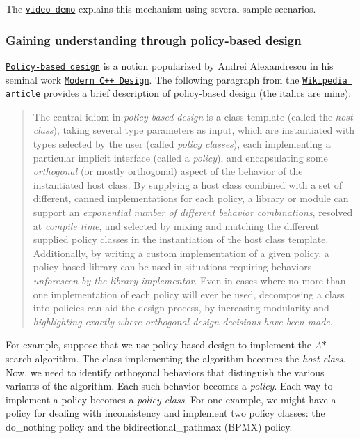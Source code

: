 The \href{https://youtu.be/cElxLWve1Zw}{\tt video demo} explains this mechanism using several sample scenarios.\hypertarget{index_s-policy}{}\subsubsection{Gaining understanding through policy-\/based design}\label{index_s-policy}
\href{https://en.wikipedia.org/wiki/Policy-based_design}{\tt Policy-\/based design} is a notion popularized by Andrei Alexandrescu in his seminal work \href{https://en.wikipedia.org/wiki/Modern_C%2B%2B_Design}{\tt Modern C++ Design}. The following paragraph from the \href{https://en.wikipedia.org/wiki/Policy-based_design}{\tt Wikipedia article} provides a brief description of policy-\/based design (the italics are mine)\+: \begin{quote}
The central idiom in {\itshape policy-\/based design} is a class template (called the {\itshape host class}), taking several type parameters as input, which are instantiated with types selected by the user (called {\itshape policy classes}), each implementing a particular implicit interface (called a {\itshape policy}), and encapsulating some {\itshape orthogonal} (or mostly orthogonal) aspect of the behavior of the instantiated host class. By supplying a host class combined with a set of different, canned implementations for each policy, a library or module can support an {\itshape exponential number of different behavior combinations}, resolved at {\itshape compile time}, and selected by mixing and matching the different supplied policy classes in the instantiation of the host class template. Additionally, by writing a custom implementation of a given policy, a policy-\/based library can be used in situations requiring behaviors {\itshape unforeseen by the library implementor}. Even in cases where no more than one implementation of each policy will ever be used, decomposing a class into policies can aid the design process, by increasing modularity and {\itshape highlighting exactly where orthogonal design decisions have been made}. \end{quote}
For example, suppose that we use policy-\/based design to implement the {\itshape A$\ast$} search algorithm. The class implementing the algorithm becomes the {\itshape host class}. Now, we need to identify orthogonal behaviors that distinguish the various variants of the algorithm. Each such behavior becomes a {\itshape policy}. Each way to implement a policy becomes a {\itshape policy class}. For one example, we might have a policy for dealing with inconsistency and implement two policy classes\+: the {\ttfamily do\+\_\+nothing} policy and the {\ttfamily bidirectional\+\_\+pathmax (B\+P\+MX)} policy.

